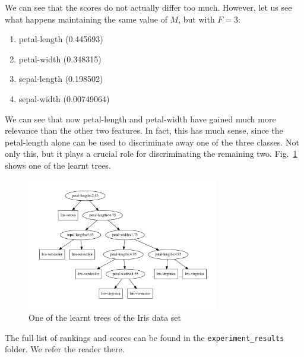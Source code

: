 \documentclass[journal, a4paper]{IEEEtran}
\begin{document}
We can see that the scores do not actually differ too much. However, let us see what happens
maintaining the same value of $ M $, but with $ F = 3 $:

\begin{enumerate}
\item petal-length (0.445693)
\item petal-width (0.348315)
\item sepal-length (0.198502)
\item sepal-width (0.00749064)
\end{enumerate}

We can see that now petal-length and petal-width have gained much more relevance than the other
two features. In fact, this has much sense, since the petal-length alone can be used to discriminate
away one of the three classes. Not only this, but it plays a crucial role for discriminating
the remaining two. Fig.~\ref{fig:iris-tree} shows one of the learnt trees.

\begin{figure}[htbp]
\centering
\includegraphics[width=0.75\textwidth]{iris1.pdf}
\caption{One of the learnt trees of the Iris data set}
\label{fig:iris-tree}
\end{figure}

The full list of rankings and scores can be found in the \texttt{experiment\_results} folder. We
refer the reader there.

\end{document}
